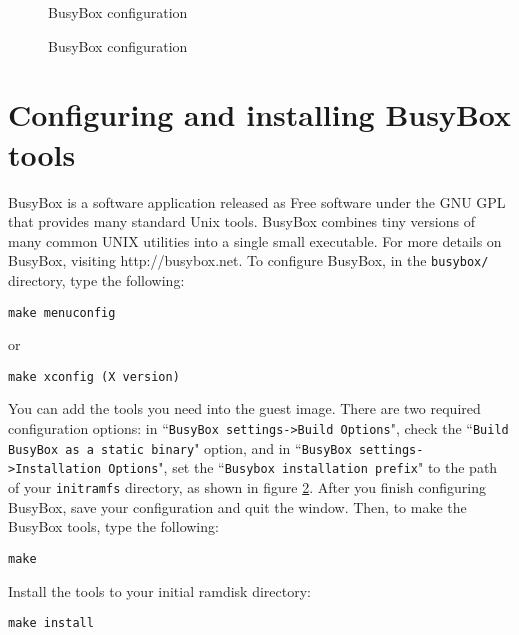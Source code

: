 \documentclass{article}[11pt]
\def\colfigsize{\epsfxsize=5in}
\begin{document}
\pagebreak
\begin{figure}[h]\begin{center}\colfigsize{}\end{center}\caption{BusyBox configuration}\label{fig:busyboxcf1}\end{figure}




\pagebreak
\begin{figure}[h]\begin{center}\colfigsize{}\end{center}\caption{BusyBox configuration}\label{fig:busyboxcf2}\end{figure}




\section{Configuring and installing BusyBox tools}

BusyBox is a software application released as Free software under the GNU GPL
that provides many standard Unix tools. BusyBox combines tiny versions of many
common UNIX utilities into a single small executable. For more details on
BusyBox, visiting http://busybox.net. To configure BusyBox, in the
\verb+busybox/+ directory, type the following:

\begin{verbatim}
make menuconfig
\end{verbatim}

or

\begin{verbatim}
make xconfig (X version)
\end{verbatim}

\vspace{10pt}
\noindent
You can add the tools you need into the guest image. There are two required
configuration options: in ``\verb|BusyBox settings->Build Options|", check the 
``\verb|Build BusyBox as a static binary|" option, and in
``\verb|BusyBox settings->Installation Options|", set the
``\verb|Busybox installation prefix|" to the path of your \verb|initramfs|
directory, as shown in figure \ref{fig:busyboxcf2}. After you finish configuring
BusyBox, save your configuration and quit the window. Then, to make the BusyBox
tools, type the following:
\begin{verbatim}
make
\end{verbatim}
Install the tools to your initial ramdisk directory:
\begin{verbatim}
make install
\end{verbatim}
\end{document}
